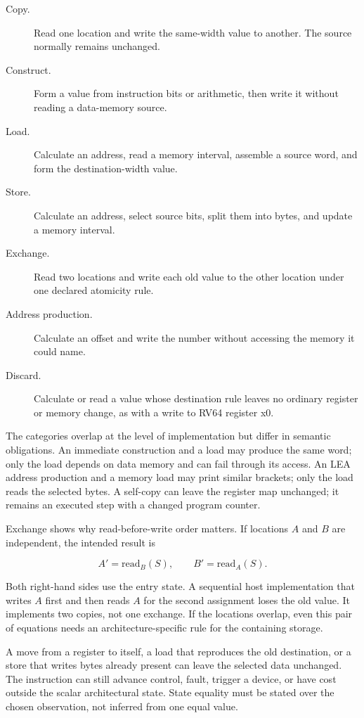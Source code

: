 \begin{description}
\item[Copy.] Read one location and write the same-width value to another. The
source normally remains unchanged.
\item[Construct.] Form a value from instruction bits or arithmetic, then write
it without reading a data-memory source.
\item[Load.] Calculate an address, read a memory interval, assemble a source
word, and form the destination-width value.
\item[Store.] Calculate an address, select source bits, split them into bytes,
and update a memory interval.
\item[Exchange.] Read two locations and write each old value to the other
location under one declared atomicity rule.
\item[Address production.] Calculate an offset and write the number without
accessing the memory it could name.
\item[Discard.] Calculate or read a value whose destination rule leaves no
ordinary register or memory change, as with a write to RV64 register x0.
\end{description}

The categories overlap at the level of implementation but differ in semantic
obligations. An immediate construction and a load may produce the same word;
only the load depends on data memory and can fail through its access. An LEA
address production and a memory load may print similar brackets; only the load
reads the selected bytes. A self-copy can leave the register map unchanged;
it remains an executed step with a changed program counter.

Exchange shows why read-before-write order matters. If locations \(A\) and
\(B\) are independent, the intended result is

\[
  A'=\mathrm{read}_B(S),\qquad B'=\mathrm{read}_A(S).
\]

Both right-hand sides use the entry state. A sequential host implementation
that writes \(A\) first and then reads \(A\) for the second assignment loses
the old value. It implements two copies, not one exchange. If the locations
overlap, even this pair of equations needs an architecture-specific rule for
the containing storage.

\begin{warning}[title={Unchanged data does not mean no effect}]
A move from a register to itself, a load that reproduces the old destination,
or a store that writes bytes already present can leave the selected data
unchanged. The instruction can still advance control, fault, trigger a device,
or have cost outside the scalar architectural state. State equality must be
stated over the chosen observation, not inferred from one equal value.
\end{warning}

